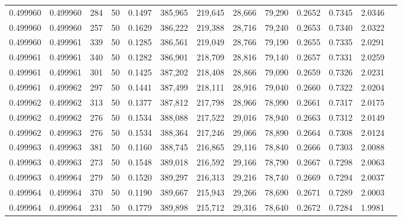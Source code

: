 \begin{tabular}{rrrrrrrrrrrrr}
0.499960 & 0.499960 &   284 &  50 &                                     0.1497 & 385,965 & 219,645 &  28,666 &  79,290 & 0.2652 & 0.7345 & 2.0346 \\
0.499960 & 0.499960 &   257 &  50 &                                     0.1629 & 386,222 & 219,388 &  28,716 &  79,240 & 0.2653 & 0.7340 & 2.0322 \\
0.499960 & 0.499961 &   339 &  50 &                                     0.1285 & 386,561 & 219,049 &  28,766 &  79,190 & 0.2655 & 0.7335 & 2.0291 \\
0.499961 & 0.499961 &   340 &  50 &                                     0.1282 & 386,901 & 218,709 &  28,816 &  79,140 & 0.2657 & 0.7331 & 2.0259 \\
0.499961 & 0.499961 &   301 &  50 &                                     0.1425 & 387,202 & 218,408 &  28,866 &  79,090 & 0.2659 & 0.7326 & 2.0231 \\
0.499961 & 0.499962 &   297 &  50 &                                     0.1441 & 387,499 & 218,111 &  28,916 &  79,040 & 0.2660 & 0.7322 & 2.0204 \\
0.499962 & 0.499962 &   313 &  50 &                                     0.1377 & 387,812 & 217,798 &  28,966 &  78,990 & 0.2661 & 0.7317 & 2.0175 \\
0.499962 & 0.499962 &   276 &  50 &                                     0.1534 & 388,088 & 217,522 &  29,016 &  78,940 & 0.2663 & 0.7312 & 2.0149 \\
0.499962 & 0.499963 &   276 &  50 &                                     0.1534 & 388,364 & 217,246 &  29,066 &  78,890 & 0.2664 & 0.7308 & 2.0124 \\
0.499963 & 0.499963 &   381 &  50 &                                     0.1160 & 388,745 & 216,865 &  29,116 &  78,840 & 0.2666 & 0.7303 & 2.0088 \\
0.499963 & 0.499963 &   273 &  50 &                                     0.1548 & 389,018 & 216,592 &  29,166 &  78,790 & 0.2667 & 0.7298 & 2.0063 \\
0.499963 & 0.499964 &   279 &  50 &                                     0.1520 & 389,297 & 216,313 &  29,216 &  78,740 & 0.2669 & 0.7294 & 2.0037 \\
0.499964 & 0.499964 &   370 &  50 &                                     0.1190 & 389,667 & 215,943 &  29,266 &  78,690 & 0.2671 & 0.7289 & 2.0003 \\
0.499964 & 0.499964 &   231 &  50 &                                     0.1779 & 389,898 & 215,712 &  29,316 &  78,640 & 0.2672 & 0.7284 & 1.9981 \\

\end{tabular}
